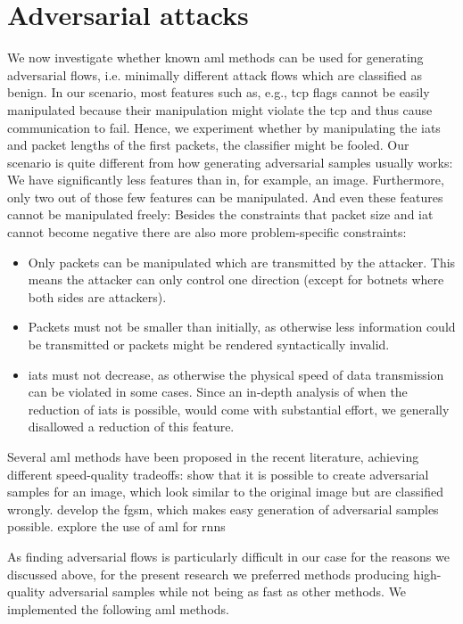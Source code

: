 \documentclass[conference]{IEEEtran}
\begin{document}
\section{Adversarial attacks}
\label{sec:adv}
We now investigate whether known \gls{aml} methods can be used for generating adversarial flows, i.e. minimally different attack flows which are classified as benign.
In our scenario, most features such as, e.g., \gls{tcp} flags cannot be easily manipulated because their manipulation might violate the \gls{tcp} and thus cause communication to fail. Hence, we experiment whether by manipulating the \glspl{iat} and packet lengths of the first packets, the classifier might be fooled.
Our scenario is quite different from how generating adversarial samples usually works: We have significantly less features than in, for example, an image. Furthermore, only two out of those few features can be manipulated. And even these features cannot be manipulated freely: Besides the constraints that packet size and \gls{iat} cannot become negative there are also more problem-specific constraints:
\begin{itemize}[topsep=0pt,wide,labelwidth=!,labelindent=0pt]
\item Only packets can be manipulated which are transmitted by the attacker. This means the attacker can only control one direction (except for botnets where both sides are attackers).
\item Packets must not be smaller than initially, as otherwise less information could be transmitted or packets might be rendered syntactically invalid.
\item \glspl{iat} must not decrease, as otherwise the physical speed of data transmission can be violated in some cases. Since an in-depth analysis of when the reduction of \glspl{iat} is possible, would come with substantial effort, we generally disallowed a reduction of this feature.
\end{itemize}

Several \gls{aml} methods have been proposed in the recent literature, achieving different speed-quality tradeoffs: 
\cite{szegedy_intriguing_2014} show that it is possible to create adversarial samples for an image, which look similar to the original image but are classified wrongly. \cite{goodfellow_explaining_2015} develop the \gls{fgsm}, which makes easy generation of adversarial samples possible. \cite{papernot_crafting_2016} explore the use of \gls{aml} for \glspl{rnn}

As finding adversarial flows is particularly difficult in our case for the reasons we discussed above, for the present research we preferred methods  producing high-quality adversarial samples while not being as fast as other methods. We implemented the following \gls{aml} methods.
\end{document}
